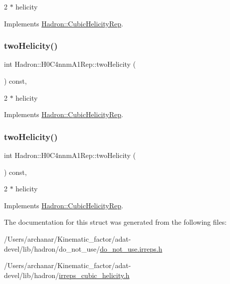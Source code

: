 2 $\ast$ helicity 

Implements \mbox{\hyperlink{structHadron_1_1CubicHelicityRep_af507aa56fc2747eacc8cb6c96db31ecc}{Hadron\+::\+Cubic\+Helicity\+Rep}}.

\mbox{\label{structHadron_1_1H0C4nnmA1Rep_a53bf7b92886bd139cfbc1cb86f44aa28}} 
\subsubsection{\texorpdfstring{twoHelicity()}{twoHelicity()}\hspace{0.1cm}{\footnotesize\ttfamily [2/3]}}
{\footnotesize\ttfamily int Hadron\+::\+H0\+C4nnm\+A1\+Rep\+::two\+Helicity (\begin{DoxyParamCaption}{ }\end{DoxyParamCaption}) const\hspace{0.3cm}{\ttfamily [inline]}, {\ttfamily [virtual]}}

2 $\ast$ helicity 

Implements \mbox{\hyperlink{structHadron_1_1CubicHelicityRep_af507aa56fc2747eacc8cb6c96db31ecc}{Hadron\+::\+Cubic\+Helicity\+Rep}}.

\mbox{\label{structHadron_1_1H0C4nnmA1Rep_a53bf7b92886bd139cfbc1cb86f44aa28}} 
\subsubsection{\texorpdfstring{twoHelicity()}{twoHelicity()}\hspace{0.1cm}{\footnotesize\ttfamily [3/3]}}
{\footnotesize\ttfamily int Hadron\+::\+H0\+C4nnm\+A1\+Rep\+::two\+Helicity (\begin{DoxyParamCaption}{ }\end{DoxyParamCaption}) const\hspace{0.3cm}{\ttfamily [inline]}, {\ttfamily [virtual]}}

2 $\ast$ helicity 

Implements \mbox{\hyperlink{structHadron_1_1CubicHelicityRep_af507aa56fc2747eacc8cb6c96db31ecc}{Hadron\+::\+Cubic\+Helicity\+Rep}}.



The documentation for this struct was generated from the following files\+:\begin{DoxyCompactItemize}
\item 
/\+Users/archanar/\+Kinematic\+\_\+factor/adat-\/devel/lib/hadron/do\+\_\+not\+\_\+use/\mbox{\hyperlink{adat-devel_2lib_2hadron_2do__not__use_2do__not__use_8irreps_8h}{do\+\_\+not\+\_\+use.\+irreps.\+h}}\item 
/\+Users/archanar/\+Kinematic\+\_\+factor/adat-\/devel/lib/hadron/\mbox{\hyperlink{adat-devel_2lib_2hadron_2irreps__cubic__helicity_8h}{irreps\+\_\+cubic\+\_\+helicity.\+h}}\end{DoxyCompactItemize}
